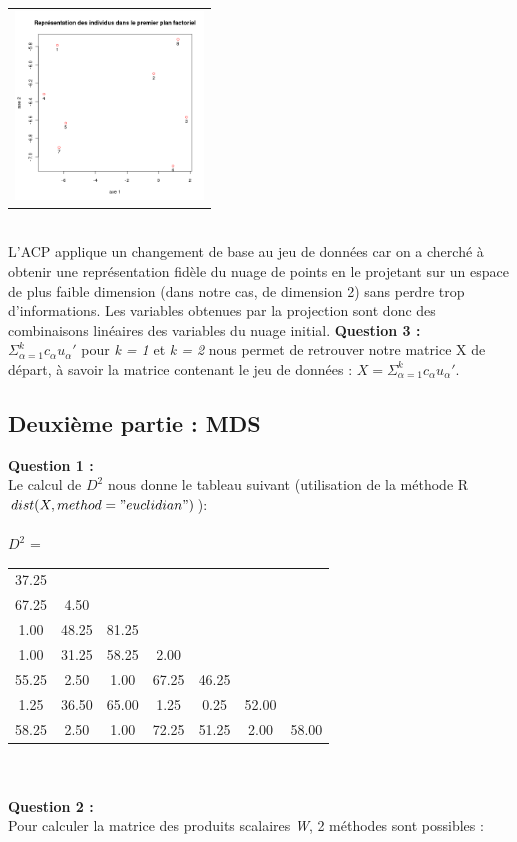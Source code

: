 \documentclass[a4paper, 10pt]{article}
\begin{document}
\hspace*{1cm}
\begin{tabular}{c}
\includegraphics[height = 5cm, width = 5cm]{plots/biplot_exo1_princomp.png}\\
\end{tabular}\\
L'ACP applique un changement de base au jeu de données car on a cherché à obtenir une représentation fidèle du nuage de points en
le projetant sur un espace de plus faible dimension (dans notre cas, de dimension 2) sans perdre trop d'informations.
Les variables obtenues par la projection sont donc des combinaisons linéaires des variables du nuage initial.
\newpage
\noindent
\textbf{Question 3 :}\\
$\varSigma^{k}_{\alpha=1} c_{\alpha}u_{\alpha}'$ pour \textit{k = 1} et \textit{k = 2} nous permet de retrouver notre matrice X de départ,
à savoir la matrice contenant le jeu de données : $X = \varSigma^{k}_{\alpha=1} c_{\alpha}u_{\alpha}'$.

\subsection*{Deuxième partie : MDS}
\textbf{Question 1 :}\\
Le calcul de \textit{$D^{2}$} nous donne le tableau suivant (utilisation de la méthode R $dist(X, method = "euclidian")$):\\ \\
$D^{2}$ = 
\begin{tabular}{|ccccccc|}
37.25 & & & & & & \\
67.25 & 4.50 & & & & & \\
1.00 & 48.25 & 81.25 & & & & \\
1.00 & 31.25 & 58.25 & 2.00 & & & \\
55.25 & 2.50 & 1.00 & 67.25 & 46.25 & & \\
1.25 & 36.50 & 65.00 & 1.25 & 0.25 & 52.00 & \\
58.25 & 2.50 & 1.00 & 72.25 & 51.25 & 2.00 & 58.00 \\
\end{tabular}\\ \\
\textbf{Question 2 :}\\
Pour calculer la matrice des produits scalaires \textit{W}, 2 méthodes sont possibles :
\end{document}
